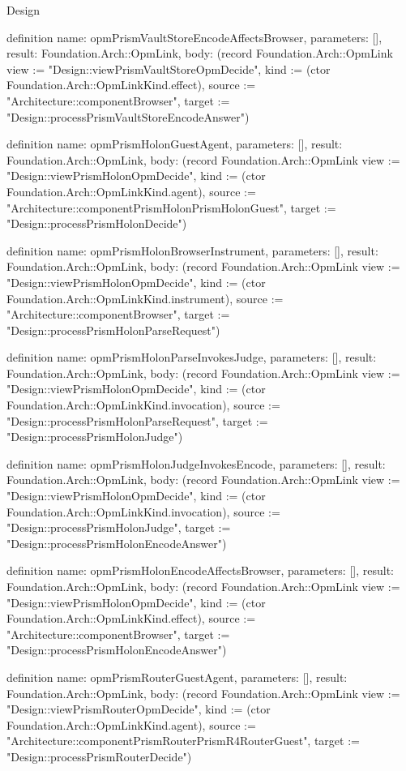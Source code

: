 \begin{lexlean}{Design}
\begin{semanticmodule}
definition{
  name: opmPrismVaultStoreEncodeAffectsBrowser,
  parameters: [],
  result: Foundation.Arch::OpmLink,
  body: (record Foundation.Arch::OpmLink {view := "Design::viewPrismVaultStoreOpmDecide", kind := (ctor Foundation.Arch::OpmLinkKind.effect), source := "Architecture::componentBrowser", target := "Design::processPrismVaultStoreEncodeAnswer"})
}

definition{
  name: opmPrismHolonGuestAgent,
  parameters: [],
  result: Foundation.Arch::OpmLink,
  body: (record Foundation.Arch::OpmLink {view := "Design::viewPrismHolonOpmDecide", kind := (ctor Foundation.Arch::OpmLinkKind.agent), source := "Architecture::componentPrismHolonPrismHolonGuest", target := "Design::processPrismHolonDecide"})
}

definition{
  name: opmPrismHolonBrowserInstrument,
  parameters: [],
  result: Foundation.Arch::OpmLink,
  body: (record Foundation.Arch::OpmLink {view := "Design::viewPrismHolonOpmDecide", kind := (ctor Foundation.Arch::OpmLinkKind.instrument), source := "Architecture::componentBrowser", target := "Design::processPrismHolonParseRequest"})
}

definition{
  name: opmPrismHolonParseInvokesJudge,
  parameters: [],
  result: Foundation.Arch::OpmLink,
  body: (record Foundation.Arch::OpmLink {view := "Design::viewPrismHolonOpmDecide", kind := (ctor Foundation.Arch::OpmLinkKind.invocation), source := "Design::processPrismHolonParseRequest", target := "Design::processPrismHolonJudge"})
}

definition{
  name: opmPrismHolonJudgeInvokesEncode,
  parameters: [],
  result: Foundation.Arch::OpmLink,
  body: (record Foundation.Arch::OpmLink {view := "Design::viewPrismHolonOpmDecide", kind := (ctor Foundation.Arch::OpmLinkKind.invocation), source := "Design::processPrismHolonJudge", target := "Design::processPrismHolonEncodeAnswer"})
}

definition{
  name: opmPrismHolonEncodeAffectsBrowser,
  parameters: [],
  result: Foundation.Arch::OpmLink,
  body: (record Foundation.Arch::OpmLink {view := "Design::viewPrismHolonOpmDecide", kind := (ctor Foundation.Arch::OpmLinkKind.effect), source := "Architecture::componentBrowser", target := "Design::processPrismHolonEncodeAnswer"})
}

definition{
  name: opmPrismRouterGuestAgent,
  parameters: [],
  result: Foundation.Arch::OpmLink,
  body: (record Foundation.Arch::OpmLink {view := "Design::viewPrismRouterOpmDecide", kind := (ctor Foundation.Arch::OpmLinkKind.agent), source := "Architecture::componentPrismRouterPrismR4RouterGuest", target := "Design::processPrismRouterDecide"})
}


\end{semanticmodule}
\end{lexlean}
